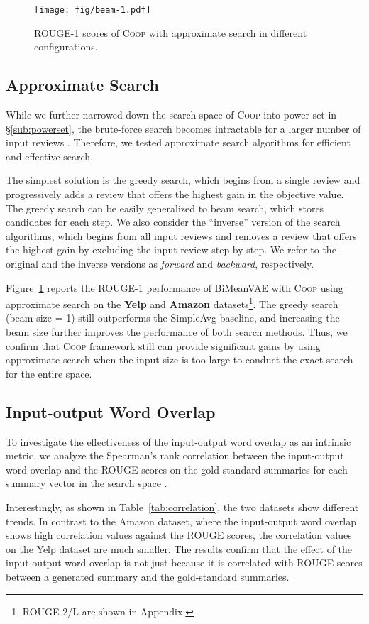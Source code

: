\documentclass[11pt]{article}
\newcommand{\aggname}{\textsc{Coop}}
\newcommand{\name}{\mbox{\sc BiMeanVAE}}
\newcommand{\simpleavg}{\mbox{SimpleAvg}}
\newcommand{\yelp}{\mbox{\bf Yelp}}
\newcommand{\amazon}{\mbox{\bf Amazon}}
\newcommand{\hl}[1]{#1}
\begin{document}
\begin{figure}[t]
    \centering
    \texttt{[image: fig/beam-1.pdf]}
    \caption{ROUGE-1 scores of \aggname{} with approximate search in different configurations.}\label{fig:beam-1}
\end{figure}

\subsection{Approximate Search}
While we further narrowed down
the search space of \aggname{} into power set in \S\ref{sub:powerset}, the brute-force search becomes intractable for a larger number of input reviews .
Therefore, we tested approximate search algorithms for efficient and effective search.

The simplest solution is the greedy search, which begins from a single review
and progressively adds a review that offers the highest gain in the objective value. The greedy search can be easily generalized to beam search, which stores  candidates for each step.
We also consider the ``inverse'' version of the search algorithms, which begins from all input reviews and removes a review that offers the highest gain by excluding the input review step by step. We refer to the original and the inverse versions as
{\em forward} and {\em backward}, respectively.

Figure~\ref{fig:beam-1} reports the ROUGE-1 performance of \name{} with \aggname{} using approximate search on the \yelp{} and \amazon{} datasets\footnote{ROUGE-2/L are shown
in Appendix.}. The greedy search (beam size = 1) still outperforms the \simpleavg{} baseline, and increasing the beam size further improves the performance of both search methods. 
Thus, we confirm that \aggname{} framework still can provide significant gains by using approximate search when the input size is too large to conduct the exact search for the entire space.

\subsection{Input-output Word Overlap}
To investigate the effectiveness of the input-output word overlap as an intrinsic metric, we analyze the \hl{Spearman's rank} correlation between the input-output word overlap and the ROUGE scores on the gold-standard summaries for each summary vector in the search space .

Interestingly, as shown in Table~\ref{tab:correlation}, the two datasets show different trends. In contrast to the Amazon dataset, where the input-output word overlap shows high correlation values against the ROUGE scores, the correlation values on the Yelp dataset are much smaller.
The results confirm that the effect of the input-output word overlap is not just because it is correlated with ROUGE scores between a generated summary and the gold-standard summaries.
\end{document}
